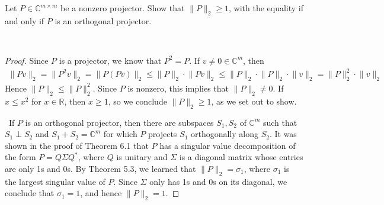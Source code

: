 \documentclass[12pt]{article}
\newenvironment{ex}[2][Exercise]{\begin{trivlist}
		\item[\hskip \labelsep {\bfseries #1}\hskip \labelsep {\bfseries #2.}]}{\end{trivlist}}
\newenvironment{sol}[1][Solution]{\begin{trivlist}
		\item[\hskip \labelsep {\bfseries #1:}]}{\end{trivlist}}
\begin{document}
\begin{ex}{5}
	Let $P\in\mathbb{C}^{m\times m}$ be a nonzero projector. Show that $\lVert P\rVert_2\geq 1$, with the
	equality if and only if $P$ is an orthogonal projector.
\end{ex}

\begin{sol}
	\
	\begin{proof}
		Since $P$ is a projector, we know that $P^2=P$. If $v\neq 0\in \mathbb{C}^m$, then
		\begin{align*}
			\lVert Pv\rVert_2 = \lVert P^2v\rVert_2 = \lVert P(Pv)\rVert_2 \leq \lVert P\rVert_2\cdot \lVert Pv\rVert_2
			\leq \lVert P\rVert_2\cdot \lVert P\rVert_2\cdot \lVert v\rVert_2=\lVert P\rVert_2^2\cdot \lVert v\rVert_2
		\end{align*}
		Hence $\lVert P\rVert_2\leq \lVert P\rVert_2^2$. Since $P$ is nonzero, this implies that $\lVert P\rVert_2\neq 0$.
		If $x\leq x^2$ for $x\in\mathbb{R}$, then $x\geq 1$, so we conclude $\lVert P\rVert_2\geq 1$, as
		we set out to show.
		
		\
		If $P$ is an orthogonal projector, then there are subspaces $S_1,S_2$ of $\mathbb{C}^m$ such that
		$S_1\perp S_2$ and $S_1+S_2=\mathbb{C}^m$ for which $P$ projects $S_1$ orthogonally along $S_2$.
		It was shown in the proof of Theorem 6.1 that $P$ has a singular value decomposition of the form
		$P=Q\Sigma Q^*$, where $Q$ is unitary and $\Sigma$ is a diagonal matrix whose entries are only 1s
		and 0s. By Theorem 5.3, we learned that $\lVert P\rVert_2=\sigma_1$, where $\sigma_1$ is the largest
		singular value of $P$. Since $\Sigma$ only has 1s and 0s on its diagonal, we conclude that
		$\sigma_1=1$, and hence $\lVert P\rVert_2 = 1$.
	\end{proof}
\end{sol}
\end{document}
